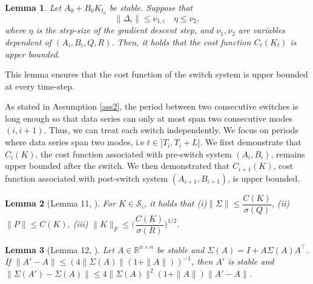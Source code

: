 \documentclass[letterpaper, 10 pt, conference]{ieeeconf}  %
\newtheorem{lemma}{Lemma}
\begin{document}
\begin{lemma}
\label{lemma_cost_upperbound}
Let \( A_0 + B_0K_{t_0} \) be stable. Suppose that
\begin{equation}
   \|\Delta_i\| \leq \nu_{1,i} \quad \eta \leq \nu_{2},
\end{equation}
where $\eta$ is the step-size of the gradient descent step, and $\nu_1, \nu_2$ are variables dependent of $(A_i, B_i, Q, R)$. Then,
it holds that the cost function $C_t(K_t)$ is upper bounded.
\end{lemma} 


This lemma ensures that the cost function of the switch system is upper bounded at every time-step.

As stated in Assumption \ref{ass2}, the period between two consecutive switches is long enough so that data series can only at most span two consecutive modes $(i, i+1)$. Thus, we can treat each switch independently. We focus on periods where data series span two modes, i.e $t \in ]T_i, T_i + L]$. We first demonstrate that $C_i(K)$, the cost function associated with pre-switch system $(A_i, B_i)$, remains upper bounded after the switch. We then demonstrated that $C_{i+1}(K)$, cost function associated with post-switch system $(A_{i+1}, B_{i+1})$, is upper bounded. 
\begin{lemma}[Lemma 11, \cite{zhao2025policy}]
\label{lemma_bounds}
For \(K\in\mathcal{S}_i\), it holds that
(i)\(\|\Sigma\| \le \dfrac{C(K)}{\sigma(Q)}\),
(ii) \(\|P\|\le C(K)\),
(iii) \(\|K\|_F \le \Big( \dfrac{C(K)}{\sigma(R)} \Big)^{1/2}\).
\end{lemma} 

\begin{lemma}[Lemma 12, \cite{zhao2025policy}]
\label{lemma_stability_margin}
Let \(A\in\mathbb{R}^{n\times n}\) be stable and \(\Sigma(A)=I + A\Sigma(A)A^\top\).
If \(\|A'-A\| \le (4\|\Sigma(A)\|(1+\|A\|))^{-1}\), then \(A'\) is stable and
\(\|\Sigma(A')-\Sigma(A)\|\le 4\|\Sigma(A)\|^2(1+\|A\|)\|A'-A\|\).
\end{lemma} \vspace{2mm}
\end{document}
